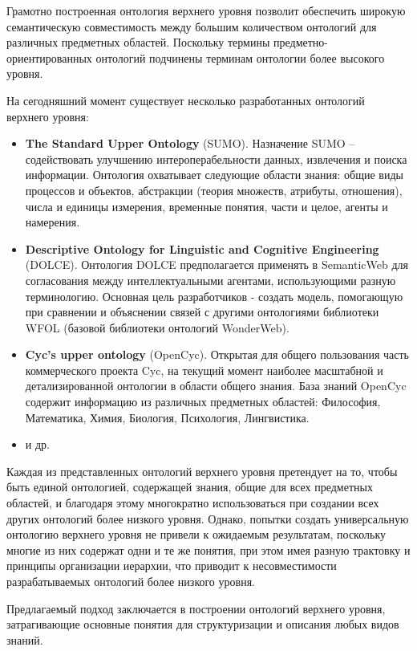 Грамотно построенная онтология верхнего уровня позволит обеспечить широкую семантическую совместимость между большим количеством онтологий для различных предметных областей. Поскольку термины предметно-ориентированных онтологий подчинены терминам онтологии более высокого уровня.

На сегодняшний момент существует несколько разработанных онтологий верхнего уровня:
\begin{itemize}
	\item{\textbf{The Standard Upper Ontology} (SUMO). Назначение SUMO -- содействовать улучшению интероперабельности данных, извлечения и поиска информации. Онтология охватывает следующие области знания: общие виды процессов и объектов, абстракции (теория множеств, атрибуты, отношения), числа и единицы измерения, временные понятия, части и целое, агенты и намерения.}
	\item{\textbf{Descriptive Ontology for Linguistic and Cognitive Engineering} (DOLCE). Онтология DOLCE предполагается применять в SemanticWeb для согласования между интеллектуальными агентами, использующими разную терминологию. Основная цель разработчиков - создать модель, помогающую при сравнении и объяснении связей с другими онтологиями библиотеки WFOL (базовой библиотеки онтологий WonderWeb).}
	\item{\textbf{Cyc’s upper ontology} (OpenCyc). Открытая для общего пользования часть коммерческого проекта Cyc, на текущий момент наиболее масштабной и детализированной онтологии в области общего знания. База знаний OpenCyc содержит информацию из различных предметных областей: Философия, Математика, Химия, Биология, Психология, Лингвистика.}
	\item{и др.}
\end{itemize}	

Каждая из представленных онтологий верхнего уровня претендует на то, чтобы быть единой онтологией, содержащей знания, общие для всех предметных областей, и благодаря этому многократно использоваться при создании всех других онтологий более низкого уровня. Однако, попытки создать универсальную онтологию верхнего уровня не привели к ожидаемым результатам, поскольку многие из них содержат одни и те же понятия, при этом имея разную трактовку и принципы организации иерархии, что приводит к несовместимости разрабатываемых онтологий более низкого уровня.

Предлагаемый подход заключается в построении онтологий верхнего уровня, затрагивающие основные понятия для структуризации и описания любых видов знаний. 

